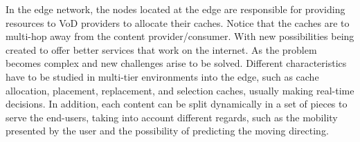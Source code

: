 
In the edge network, the nodes located at the edge are responsible for providing resources to VoD providers to allocate their caches. 
Notice that the caches are to multi-hop away from the content provider/consumer. 
With new possibilities being created to offer better services that work on the internet. As the problem becomes complex and new challenges arise to be solved. Different characteristics have to be studied in multi-tier environments into the edge, such as cache allocation, placement, replacement, and selection caches, usually making real-time decisions. In addition, each content can be split dynamically in a set of pieces to serve the end-users, taking into account different regards, such as the mobility presented by the user and the possibility of predicting the moving directing. 

